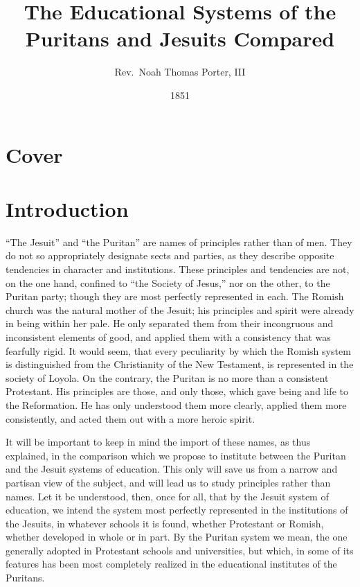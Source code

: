 \documentclass[]{book}
\title{The Educational Systems of the Puritans and Jesuits Compared}
\author{Rev.~Noah Thomas Porter, III}
\date{1851}
\begin{document}
\maketitle

{
\setcounter{tocdepth}{1}
\tableofcontents
}
\hypertarget{cover}{%
\chapter*{Cover}\label{cover}}

\hypertarget{introduction}{%
\chapter*{Introduction}\label{introduction}}

``The Jesuit'' and ``the Puritan'' are names of principles rather than of men. They do not so appropriately designate sects and parties, as they describe opposite tendencies in character and institutions. These principles and tendencies are not, on the one hand, confined to ``the Society of Jesus,'' nor on the other, to the Puritan party; though they are most perfectly represented in each. The Romish church was the natural mother of the Jesuit; his principles and spirit were already in being within her pale. He only separated them from their incongruous and inconsistent elements of good, and applied them with a consistency that was fearfully rigid. It would seem, that every peculiarity by which the Romish system is distinguished from the Christianity of the New Testament, is represented in the society of Loyola. On the contrary, the Puritan is no more than a consistent Protestant. His principles are those, and only those, which gave being and life to the Reformation. He has only understood them more clearly, applied them more consistently, and acted them out with a more heroic spirit.

It will be important to keep in mind the import of these names, as thus explained, in the comparison which we propose to institute between the Puritan and the Jesuit systems of education. This only will save us from a narrow and partisan view of the subject, and will lead us to study principles rather than names. Let it be understood, then, once for all, that by the Jesuit system of education, we intend the system most perfectly represented in the institutions of the Jesuits, in whatever schools it is found, whether Protestant or Romish, whether developed in whole or in part. By the Puritan system we mean, the one generally adopted in Protestant schools and universities, but which, in some of its features has been most completely realized in the educational institutes of the Puritans.
\end{document}
